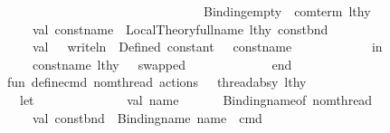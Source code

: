 \begin{isabellebody}
\ \ \ \ \ \ \ \ \ \ \ \ \ \ \ \ \ \ \ \ \ \ \ \ \ \ \ \ \ \ \ \ \ \ \ \ \ \ \ \ \ {\isacharparenleft}{\kern0pt}{\isacharparenleft}{\kern0pt}Binding{\isachardot}{\kern0pt}empty{\isacharcomma}{\kern0pt}\ {\isacharbrackleft}{\kern0pt}{\isacharbrackright}{\kern0pt}{\isacharparenright}{\kern0pt}{\isacharcomma}{\kern0pt}\ com{\isacharunderscore}{\kern0pt}term{\isacharparenright}{\kern0pt}{\isacharparenright}{\kern0pt}\ lthy\isanewline
\ \ \ \ \ \ \ \ \ \ \ \ \ \ val\ const{\isacharunderscore}{\kern0pt}name\ {\isacharequal}{\kern0pt}\ Local{\isacharunderscore}{\kern0pt}Theory{\isachardot}{\kern0pt}full{\isacharunderscore}{\kern0pt}name\ lthy{\isacharprime}{\kern0pt}\ const{\isacharunderscore}{\kern0pt}bnd\isanewline
\ \ \ \ \ \ \ \ \ \ \ \ \ \ val\ {\isacharunderscore}{\kern0pt}\ {\isacharequal}{\kern0pt}\ writeln\ {\isacharparenleft}{\kern0pt}{\isachardoublequote}{\kern0pt}{\isasymcheckmark}\ Defined\ constant{\isacharcolon}{\kern0pt}\ {\isachardoublequote}{\kern0pt}\ {\isacharcircum}{\kern0pt}\ const{\isacharunderscore}{\kern0pt}name{\isacharparenright}{\kern0pt}\isanewline
\ \ \ \ \ \ \ \ \ \ \ \ in\isanewline
\ \ \ \ \ \ \ \ \ \ \ \ \ \ {\isacharparenleft}{\kern0pt}const{\isacharunderscore}{\kern0pt}name{\isacharcomma}{\kern0pt}\ lthy{\isacharprime}{\kern0pt}{\isacharparenright}{\kern0pt}\ \ {\isacharparenleft}{\kern0pt}{\isacharasterisk}{\kern0pt}\ swapped{\isacharbang}{\kern0pt}\ {\isacharasterisk}{\kern0pt}{\isacharparenright}{\kern0pt}\isanewline
\ \ \ \ \ \ \ \ \ \ \ \ end{\isacharasterisk}{\kern0pt}{\isacharparenright}{\kern0pt}\isanewline
\ \ \ \ \ \ \ \ \ \ fun\ define{\isacharunderscore}{\kern0pt}cmd\ {\isacharparenleft}{\kern0pt}{\isacharbraceleft}{\kern0pt}nom{\isacharunderscore}{\kern0pt}thread{\isacharcomma}{\kern0pt}\ actions{\isacharcomma}{\kern0pt}\ {\isachardot}{\kern0pt}{\isachardot}{\kern0pt}{\isachardot}{\kern0pt}{\isacharbraceright}{\kern0pt}\ {\isacharcolon}{\kern0pt}\ thread{\isacharunderscore}{\kern0pt}absy{\isacharparenright}{\kern0pt}\ lthy\ {\isacharequal}{\kern0pt}\isanewline
\ \ \ \ \ \ \ \ \ \ \ \ let\isanewline
\ \ \ \ \ \ \ \ \ \ \ \ \ \ val\ name\ \ \ \ \ \ {\isacharequal}{\kern0pt}\ Binding{\isachardot}{\kern0pt}name{\isacharunderscore}{\kern0pt}of\ nom{\isacharunderscore}{\kern0pt}thread\isanewline
\ \ \ \ \ \ \ \ \ \ \ \ \ \ val\ const{\isacharunderscore}{\kern0pt}bnd\ {\isacharequal}{\kern0pt}\ Binding{\isachardot}{\kern0pt}name\ {\isacharparenleft}{\kern0pt}name\ {\isacharcircum}{\kern0pt}\ {\isachardoublequote}{\kern0pt}{\isacharunderscore}{\kern0pt}cmd{\isachardoublequote}{\kern0pt}{\isacharparenright}{\kern0pt}\isanewline

\end{isabellebody}
